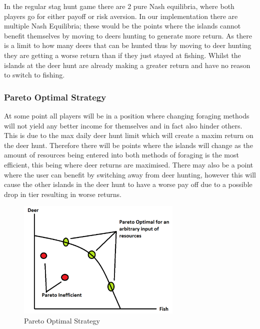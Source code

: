In the regular stag hunt game there are 2 pure Nash equilibria, where both players go for either payoff or risk aversion. In our implementation there are multiple Nash Equilibria; these would be the points where the islands cannot benefit themselves by moving to deers hunting to generate more return. As there is a limit to how many deers that can be hunted thus by moving to deer hunting they are getting a worse return than if they just stayed at fishing. Whilst the islands at the deer hunt are already making a greater return and have no reason to switch to fishing.\\ 

\subsubsection{Pareto Optimal Strategy}

At some point all players will be in a position where changing foraging methods will not yield any better income for themselves and in fact also hinder others. This is due to the max daily deer hunt limit which will create a maxim return on the deer hunt. Therefore there will be points where the islands will change as the amount of resources being entered into both methods of foraging is the most efficient, this being where deer returns are maximised. There may also be a point where the user can benefit by switching away from deer hunting, however this will cause the other islands in the deer hunt to have a worse pay off due to a possible drop in tier resulting in worse returns.\\

\begin{figure}[!htb]
    \centering
    \includegraphics[width=0.7\textwidth]{04_environment/Images/Pareto Optimal Strategy.PNG}
    \caption{Pareto Optimal Strategy}
    \label{Images:Pareto Optimal Strategy}
\end{figure}

